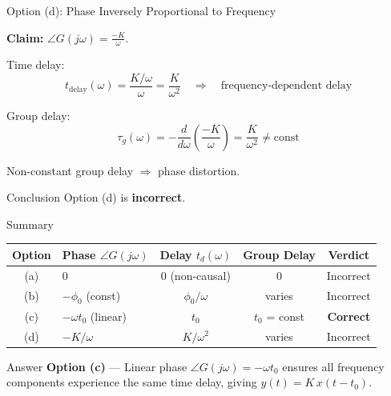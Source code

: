 \documentclass{beamer}
\begin{document}
\begin{frame}{Option (d): Phase Inversely Proportional to Frequency}

\textbf{Claim:} $\displaystyle\angle G(j\omega) = \frac{-K}{\omega}$.

\vspace{0.5em}
Time delay:
\[
  t_{\text{delay}}(\omega) = \frac{K/\omega}{\omega} = \frac{K}{\omega^2}
  \quad \Longrightarrow \quad \text{frequency-dependent delay}
\]

Group delay:
\[
  \tau_g(\omega) = -\frac{d}{d\omega}\!\left(\frac{-K}{\omega}\right)
                = \frac{K}{\omega^2} \neq \text{const}
\]

Non-constant group delay $\Rightarrow$ phase distortion.

\vspace{0.4em}
\begin{block}{Conclusion}
  Option (d) is \textbf{incorrect}.
\end{block}
\end{frame}

\begin{frame}{Summary}

\begin{center}
\renewcommand{\arraystretch}{1.6}
\begin{tabular}{clccc}
\hline
\textbf{Option} & \textbf{Phase} $\angle G(j\omega)$
  & \textbf{Delay} $t_d(\omega)$
  & \textbf{Group Delay}
  & \textbf{Verdict} \\
\hline
(a) & $0$ & $0$ (non-causal) & $0$ & Incorrect \\
(b) & $-\phi_0$ (const) & $\phi_0/\omega$ & varies & Incorrect \\
(c) & $-\omega t_0$ (linear) & $t_0$ & $t_0$ = const & \textbf{Correct} \\
(d) & $-K/\omega$ & $K/\omega^2$ & varies & Incorrect \\
\hline
\end{tabular}
\end{center}

\vspace{0.6em}
\begin{block}{Answer}
\textbf{Option (c)} — Linear phase $\angle G(j\omega) = -\omega t_0$ ensures
all frequency components experience the same time delay, giving
$y(t) = K\,x(t - t_0)$.
\end{block}
\end{frame}
\end{document}
